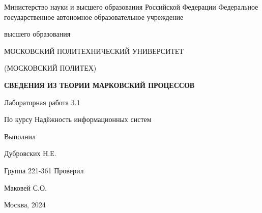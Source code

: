 \singlespacing

\newpage
\begin{center}
    Министерство науки и высшего образования Российской Федерации
    Федеральное государственное автономное образовательное учреждение

    высшего образования

    \guillemotleft МОСКОВСКИЙ ПОЛИТЕХНИЧЕСКИЙ УНИВЕРСИТЕТ\guillemotright

    (МОСКОВСКИЙ ПОЛИТЕХ)
\end{center}
\noindent
\bigbreak
\bigbreak
\bigbreak
\bigbreak
\begin{center}
    \textbf{СВЕДЕНИЯ ИЗ ТЕОРИИ МАРКОВСКИЙ ПРОЦЕССОВ}
    \bigskip
    \bigskip
    \bigskip
    \bigskip
    \bigskip

    Лабораторная работа 3.1

    По курсу \guillemotleft Надёжность информационных систем\guillemotright
    \bigskip

    \bigbreak
    \bigbreak
    \bigbreak
    \bigbreak
\end{center}
\noindent
\bigbreak
\bigbreak
\bigbreak
\bigbreak
\bigbreak
\bigbreak
\bigbreak
\bigbreak
\bigbreak
\bigbreak
\hfill Выполнил

\hfill Дубровских Н.Е.

\hfill Группа 221-361
\bigbreak
\bigbreak
\bigbreak
\hfill Проверил

\hfill Маковей С.О.
\vfill
\begin{center}
    Москва, 2024
\end{center}
\newpage
\onehalfspacing
